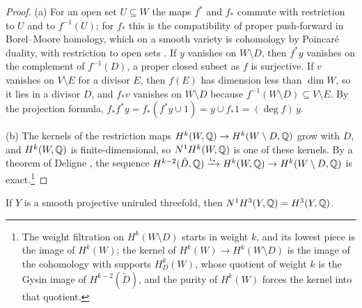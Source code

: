 \begin{proof}
(a) For an open set $U\subseteq W$ the maps $f^{*}$ and $f_{*}$ commute with
restriction to $U$ and to $f^{-1}(U)$; for $f_{*}$ this is the compatibility
of proper push-forward in Borel--Moore homology, which on a smooth variety
is cohomology by Poincar\'e duality, with restriction to open sets
\cite[\S19.1]{Ful98}. If $y$ vanishes on $W\setminus D$, then $f^{*}y$
vanishes on the complement of $f^{-1}(D)$, a proper closed subset as $f$ is
surjective. If $v$ vanishes on $V\setminus E$ for a divisor $E$, then $f(E)$
has dimension less than $\dim W$, so it lies in a divisor $D$, and $f_{*}v$
vanishes on $W\setminus D$ because $f^{-1}(W\setminus D)\subseteq V\setminus
E$. By the projection formula, $f_{*}f^{*}y=f_{*}(f^{*}y\cup1)=y\cup
f_{*}1=(\deg f)\,y$.

(b) The kernels of the restriction maps $H^{k}(W,\mathbb{Q})\to H^{k}(W\setminus
D,\mathbb{Q})$ grow with $D$, and $H^{k}(W,\mathbb{Q})$ is finite-dimensional, so
$N^{1}H^{k}(W,\mathbb{Q})$ is one of these kernels. By a theorem of Deligne
\cite[Corollaire~8.2.8]{Del74}, the sequence $H^{k-2}(\tilde D,\mathbb{Q})
\xrightarrow{\iota_{*}}H^{k}(W,\mathbb{Q})\to H^{k}(W\setminus D,\mathbb{Q})$ is
exact.\footnote{The weight filtration on $H^{k}(W\setminus D)$ starts in
weight $k$, and its lowest piece is the image of $H^{k}(W)$; the kernel of
$H^{k}(W)\to H^{k}(W\setminus D)$ is the image of the cohomology with
supports $H^{k}_{D}(W)$, whose quotient of weight $k$ is the Gysin image of
$H^{k-2}(\tilde D)$, and the purity of $H^{k}(W)$ forces the kernel into
that quotient.}
\end{proof}

\begin{lemma}\label{lem:uniruledN1}
If $Y$ is a smooth projective uniruled threefold, then $N^{1}H^{3}(Y,\mathbb{Q})=
H^{3}(Y,\mathbb{Q})$.
\end{lemma}

